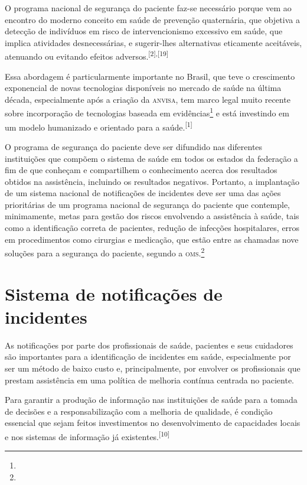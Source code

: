 \documentclass{article}
\begin{document}
O programa nacional de segurança do paciente faz-se necessário porque vem ao
encontro do
moderno conceito em saúde de prevenção quaternária, que objetiva a detecção de
indivíduos em
risco de intervencionismo excessivo em saúde, que implica atividades
desnecessárias, e
sugerir-lhes alternativas eticamente aceitáveis, atenuando ou evitando efeitos
adversos.\textsuperscript{[}\textsuperscript{2}\textsuperscript{]}\textsuperscript{,}\textsuperscript{[}\textsuperscript{19}\textsuperscript{]}

Essa abordagem é particularmente importante no Brasil, que teve o crescimento
exponencial
de novas tecnologias disponíveis no mercado de saúde na última década,
especialmente após a
criação da \textsc{anvisa}, tem marco legal muito recente sobre incorporação de
tecnologias baseada
em evidências\footnote{}
e está investindo em um modelo humanizado e orientado para a saúde.\textsuperscript{[}\textsuperscript{1}\textsuperscript{]}

O programa de segurança do paciente deve ser difundido nas diferentes
instituições que
compõem o sistema de saúde em todos os estados da federação a fim de que
conheçam e
compartilhem o conhecimento acerca dos resultados obtidos na assistência,
incluindo os
resultados negativos. Portanto, a implantação de um sistema nacional de
notificações de
incidentes deve ser uma das ações prioritárias de um programa nacional de
segurança do
paciente que contemple, minimamente, metas para gestão dos riscos envolvendo a
assistência à
saúde, tais como a identificação correta de pacientes, redução de infecções
hospitalares,
erros em procedimentos como cirurgias e medicação, que estão entre as chamadas
nove soluções
para a segurança do paciente, segundo a \textsc{oms}.\footnote{}

\section{Sistema de notificações de incidentes}

As notificações por parte dos profissionais de saúde, pacientes e seus
cuidadores são
importantes para a identificação de incidentes em saúde, especialmente por ser
um método de
baixo custo e, principalmente, por envolver os profissionais que prestam
assistência em uma
política de melhoria contínua centrada no paciente.

Para garantir a produção de informação nas instituições de saúde para a tomada
de decisões
e a responsabilização com a melhoria de qualidade, é condição essencial que
sejam feitos
investimentos no desenvolvimento de capacidades locais e nos sistemas de
informação já
existentes.\textsuperscript{[}\textsuperscript{10}\textsuperscript{]}
\end{document}
